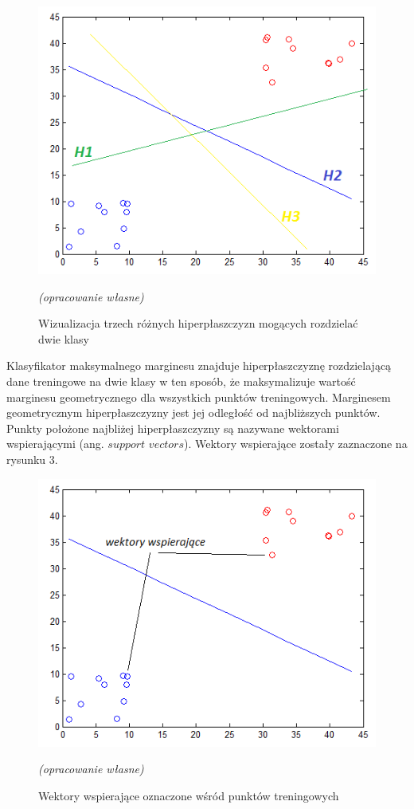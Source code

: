 \documentclass[[10pt,a4paper]{article}
\begin{document}
\begin{figure}[h]
\centering
\includegraphics{svm_hyperplane}\\
\caption{Wizualizacja trzech różnych hiperpłaszczyzn mogących rozdzielać dwie klasy }
\textit{(opracowanie własne)}
\end{figure}

\newpage
Klasyfikator maksymalnego marginesu znajduje hiperpłaszczyznę rozdzielającą dane treningowe na dwie klasy w ten sposób, że maksymalizuje wartość marginesu geometrycznego dla wszystkich punktów treningowych. Marginesem geometrycznym hiperpłaszczyzny jest jej odległość od najbliższych punktów. Punkty położone najbliżej hiperpłaszczyzny są nazywane wektorami wspierającymi (ang. $support$ $vectors$). Wektory wspierające zostały zaznaczone na rysunku 3.

\begin{figure}[h]
\centering
\includegraphics{support_vectors}\\
\caption{Wektory wspierające oznaczone wśród punktów treningowych }
\textit{(opracowanie własne)}
\end{figure}
\end{document}

